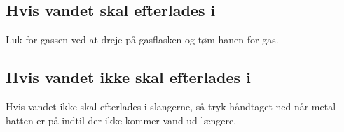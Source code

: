 \subsection{Hvis vandet skal efterlades i}
Luk for gassen ved at dreje på gasflasken og tøm hanen for gas.

\subsection{Hvis vandet ikke skal efterlades i}
Hvis vandet ikke skal efterlades i slangerne, så tryk håndtaget ned
når metal-hatten er på indtil der ikke kommer vand ud længere.



